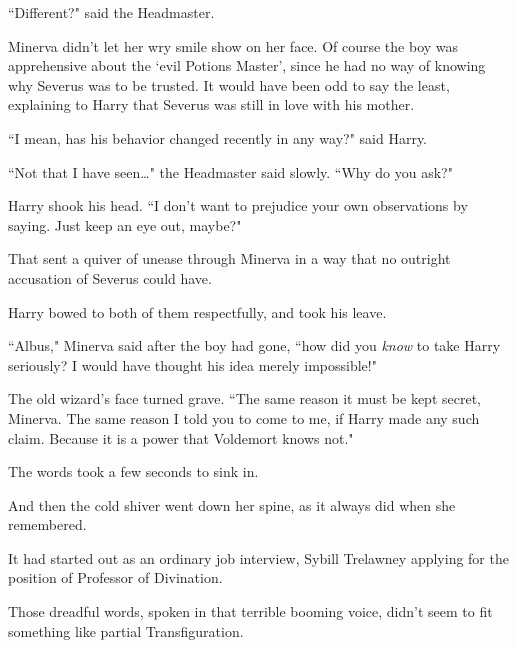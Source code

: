``Different?" said the Headmaster.

Minerva didn't let her wry smile show on her face. Of course the boy was apprehensive about the `evil Potions Master', since he had no way of knowing why Severus was to be trusted. It would have been odd to say the least, explaining to Harry that Severus was still in love with his mother.

``I mean, has his behavior changed recently in any way?" said Harry.

``Not that I have seen{\ldots}" the Headmaster said slowly. ``Why do you ask?"

Harry shook his head. ``I don't want to prejudice your own observations by saying. Just keep an eye out, maybe?"

That sent a quiver of unease through Minerva in a way that no outright accusation of Severus could have.

Harry bowed to both of them respectfully, and took his leave.

\later

``Albus," Minerva said after the boy had gone, ``how did you \emph{know} to take Harry seriously? I would have thought his idea merely impossible!"

The old wizard's face turned grave. ``The same reason it must be kept secret, Minerva. The same reason I told you to come to me, if Harry made any such claim. Because it is a power that Voldemort knows not."

The words took a few seconds to sink in.

And then the cold shiver went down her spine, as it always did when she remembered.

It had started out as an ordinary job interview, Sybill Trelawney applying for the position of Professor of Divination.


Those dreadful words, spoken in that terrible booming voice, didn't seem to fit something like partial Transfiguration.

